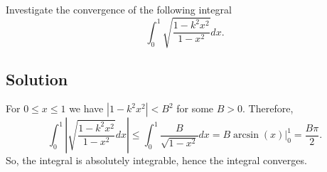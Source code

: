 Investigate the convergence of the following integral
\begin{equation*}
    \int_0^1 \sqrt{\frac{1 - k^2 x^2}{1 - x^2}} dx.
\end{equation*}

\subsection*{Solution}

For $0 \leq x \leq 1$ we have $|1 - k^2 x^2| < B^2$ for some $B > 0$.
Therefore,
\begin{equation*}
    \int_0^1 \left| \sqrt{\frac{1 - k^2 x^2}{1 - x^2}} dx \right|
        \leq \int_0^1 \frac{B}{\sqrt{1 - x^2}} dx
        = B \left. \arcsin(x) \right|_0^1
        = \frac{B \pi}{2}.
\end{equation*}
So, the integral is absolutely integrable, hence the integral converges.
